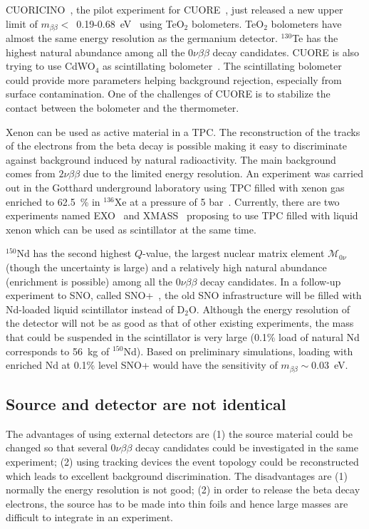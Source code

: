 CUORICINO~\cite{Pre04}, the pilot experiment for CUORE~\cite{Arn04, Ard05}, just released a new upper limit of $m_{\beta\beta} <$~0.19-0.68~eV~\cite{Arn08} using TeO$_{2}$ bolometers. TeO$_{2}$ bolometers have almost the same energy resolution as the germanium detector. $^{130}$Te has the highest natural abundance among all the $0\nu\beta\beta$ decay candidates. CUORE is also trying to use CdWO$_{4}$ as scintillating bolometer~\cite{Gir08}. The scintillating bolometer could provide more parameters helping background rejection, especially from surface contamination. One of the challenges of CUORE is to stabilize the contact between the bolometer and the thermometer.

Xenon can be used as active material in a TPC. The reconstruction of the tracks of the electrons from the beta decay is possible making it easy to discriminate against background induced by natural radioactivity. The main background comes from $2\nu\beta\beta$ due to the limited energy resolution. An experiment was carried out in the Gotthard underground laboratory using TPC filled with xenon gas enriched to 62.5~\% in $^{136}$Xe at a pressure of 5 bar~\cite{Lue98}. Currently, there are two experiments named EXO~\cite{Dani00} and XMASS~\cite{Kim05} proposing to use TPC filled with liquid xenon which can be used as scintillator at the same time.

$^{150}$Nd has the second highest $Q$-value, the largest nuclear matrix element $\mathcal{M}_{0\nu}$ (though the uncertainty is large) and a relatively high natural abundance (enrichment is possible) among all the $0\nu\beta\beta$ decay candidates. In a follow-up experiment to SNO, called SNO+~\cite{Zub07}, the old SNO infrastructure will be filled with Nd-loaded liquid scintillator instead of D$_{2}$O. Although the energy resolution of the detector will not be as good as that of other existing experiments, the mass that could be suspended in the scintillator is very large (0.1\% load of natural Nd corresponds to 56~kg of $^{150}$Nd). Based on preliminary simulations, loading with enriched Nd at 0.1\% level SNO+ would have the sensitivity of $m_{\beta\beta} \sim 0.03$~eV.

\subsection{Source and  detector are not identical}
\label{sec:exp:sued}
The advantages of using external detectors are (1) the source material could be changed so that several $0\nu\beta\beta$ decay candidates could be investigated in the same experiment; (2) using tracking devices the event topology could be reconstructed which leads to excellent background discrimination. The disadvantages are (1) normally the energy resolution is not good; (2) in order to release the beta decay electrons, the source has to be made into thin foils and hence large masses are difficult to integrate in an experiment.

